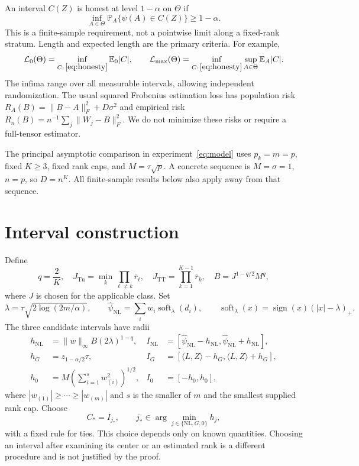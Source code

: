 \documentclass[11pt]{article}
\theoremstyle{remark}
\newcommand{\E}{\mathbb E}
\newcommand{\PP}{\mathbb P}
\newcommand{\ip}[2]{\langle #1,#2\rangle}
\newcommand{\norm}[1]{\lVert #1\rVert}
\newcommand{\soft}{\operatorname{soft}}
\newcommand{\Tu}{\mathrm{Tu}}
\newcommand{\TT}{\mathrm{TT}}
\newcommand{\NL}{\mathrm{NL}}
\newcommand{\calL}{\mathcal L}
\begin{document}
An interval $C(Z)$ is honest at level $1-\alpha$ on $\Theta$ if
\begin{equation}\label{eq:honesty}
 \inf_{A\in\Theta}\PP_A\{\psi(A)\in C(Z)\}\ge1-\alpha.
\end{equation}
This is a finite-sample requirement, not a pointwise limit along a fixed-rank stratum. Length and expected length are the primary criteria. For example,
\begin{equation}\label{eq:minimaxcriteria}
 \calL_0(\Theta)=\inf_{C:\,\eqref{eq:honesty}}\E_0|C|,
 \qquad \calL_{\max}(\Theta)=\inf_{C:\,\eqref{eq:honesty}}\sup_{A\in\Theta}\E_A|C|.
\end{equation}
The infima range over all measurable intervals, allowing independent randomization. The usual squared Frobenius estimation loss has population risk $R_A(B)=\norm{B-A}_F^2+D\sigma^2$ and empirical risk $R_n(B)=n^{-1}\sum_j\norm{W_j-B}_F^2$. We do not minimize these risks or require a full-tensor estimator.

The principal asymptotic comparison in experiment~\eqref{eq:model} uses $p_k=m=p$, fixed $K\ge3$, fixed rank caps, and $M=\tau\sqrt p$. A concrete sequence is $M=\sigma=1$, $n=p$, so $D=n^K$. All finite-sample results below also apply away from that sequence.

\section{Interval construction}\label{sec:method}

Define
\begin{equation}\label{eq:constants}
 q=\frac2K,\quad
 J_{\Tu}=\min_k\prod_{\ell\ne k}\bar r_\ell,\quad
 J_{\TT}=\prod_{k=1}^{K-1}\bar r_k,\quad B=J^{1-q/2}M^q,
\end{equation}
where $J$ is chosen for the applicable class. Set
\begin{equation}\label{eq:threshold}
 \lambda=\tau\sqrt{2\log(2m/\alpha)},\qquad
 \widehat\psi_{\NL}=\sum_iw_i\soft_\lambda(d_i),\qquad
 \soft_\lambda(x)=\operatorname{sign}(x)(|x|-\lambda)_+.
\end{equation}
The three candidate intervals have radii
\begin{align}
 h_{\NL}&=\norm w_\infty B(2\lambda)^{1-q},&
 I_{\NL}&=[\widehat\psi_{\NL}-h_{\NL},\widehat\psi_{\NL}+h_{\NL}],\label{eq:nl}\\
 h_G&=z_{1-\alpha/2}\tau,&
 I_G&=[\ip LZ-h_G,\ip LZ+h_G],\label{eq:direct}\\
 h_0&=M\left(\sum_{i=1}^s w_{(i)}^2\right)^{1/2},&
 I_0&=[-h_0,h_0],\label{eq:zero}
\end{align}
where $|w_{(1)}|\ge\cdots\ge|w_{(m)}|$ and $s$ is the smaller of $m$ and the smallest supplied rank cap. Choose
\begin{equation}\label{eq:select}
 C_*=I_{j_*},\qquad j_*\in\arg\min_{j\in\{\NL,G,0\}}h_j,
\end{equation}
with a fixed rule for ties. This choice depends only on known quantities. Choosing an interval after examining its center or an estimated rank is a different procedure and is not justified by the proof.
\end{document}
